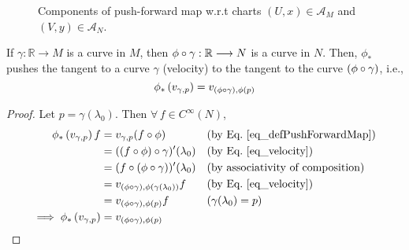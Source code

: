 \begin{SCfigure}[5][h]
  \centering
    \caption{Components of push-forward map w.r.t charts $(U,x) \in \mathcal{A}_M$ and $(V,y) \in \mathcal{A}_N$.}
\end{SCfigure}

\begin{theorem}
If $\gamma : \mathbb{R} \to M$ is a curve in $M$, then $\phi \circ \gamma : \mathbb{R} \longrightarrow N$ is a curve in $N$. Then, $\phi_\ast$ pushes the tangent to a curve $\gamma$ (velocity) to the tangent to the curve $(\phi \circ \gamma)$, i.e.,
\begin{equation}
\phi_\ast\left(v_{\gamma, p}\right) = v_{(\phi \circ \gamma), \phi(p)}
\end{equation}
\end{theorem}
\begin{proof}
Let $p = \gamma(\lambda_0)$. Then $\forall \, f \in C^\infty(N)$,
\begin{align*}
\phi_\ast\left(v_{\gamma, p}\right) f & = v_{\gamma, p} (f \circ \phi) && (\text{by Eq.~\ref{eq_defPushForwardMap}}) \\
& = ((f \circ \phi) \circ \gamma)^\prime (\lambda_0) && (\text{by Eq.~\ref{eq_velocity}}) \\
& = (f \circ (\phi \circ \gamma))^\prime (\lambda_0) && (\text{by associativity of composition}) \\
& = v_{(\phi \circ \gamma), \phi(\gamma(\lambda_0))} f && (\text{by Eq.~\ref{eq_velocity}}) \\
& = v_{(\phi \circ \gamma), \phi(p)} f && (\gamma(\lambda_0) = p) \\
\implies \phi_\ast\left(v_{\gamma, p}\right) & = v_{(\phi \circ \gamma), \phi(p)}
\end{align*}
\end{proof}

